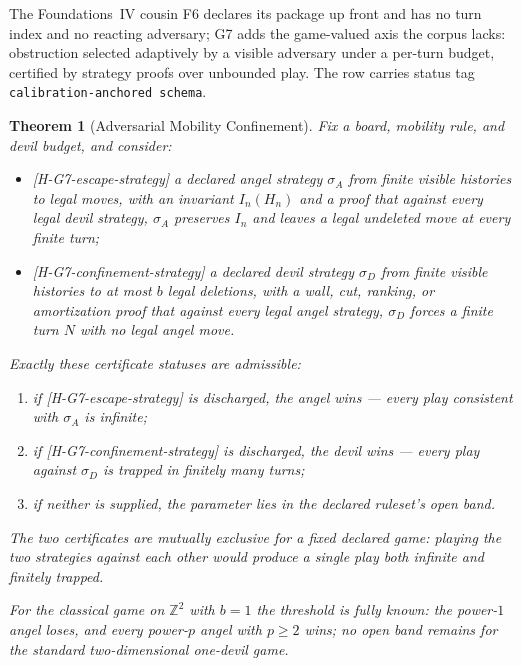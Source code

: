 \documentclass[11pt]{article}
\newcommand{\lawGSeven}{Adversarial Mobility Confinement}
\newtheorem{theorem}{Theorem}[section]
\theoremstyle{definition}
\begin{document}
The Foundations~IV cousin F6 declares its package up front and has no turn index and no reacting
adversary; G7 adds the game-valued axis the corpus lacks: obstruction selected adaptively by a
visible adversary under a per-turn budget, certified by strategy proofs over unbounded play. The row
carries status tag \texttt{calibration-anchored schema}.

\begin{theorem}[\lawGSeven]\label{thm:G7}
Fix a board, mobility rule, and devil budget, and consider:
\begin{itemize}
  \item \textup{[H-G7-escape-strategy]} a declared angel strategy $\sigma_A$ from finite visible
    histories to legal moves, with an invariant $I_n(H_n)$ and a proof that against every legal devil
    strategy, $\sigma_A$ preserves $I_n$ and leaves a legal undeleted move at every finite turn;
  \item \textup{[H-G7-confinement-strategy]} a declared devil strategy $\sigma_D$ from finite visible
    histories to at most $b$ legal deletions, with a wall, cut, ranking, or amortization proof that
    against every legal angel strategy, $\sigma_D$ forces a finite turn $N$ with no legal angel move.
\end{itemize}
Exactly these certificate statuses are admissible:
\begin{enumerate}
  \item if \textup{[H-G7-escape-strategy]} is discharged, the angel wins --- every play consistent
    with $\sigma_A$ is infinite;
  \item if \textup{[H-G7-confinement-strategy]} is discharged, the devil wins --- every play against
    $\sigma_D$ is trapped in finitely many turns;
  \item if neither is supplied, the parameter lies in the declared ruleset's open band.
\end{enumerate}
The two certificates are mutually exclusive for a fixed declared game: playing the two strategies
against each other would produce a single play both infinite and finitely trapped.

For the classical game on $\mathbb{Z}^2$ with $b = 1$ the threshold is fully known: the power-$1$
angel loses, and every power-$p$ angel with $p \ge 2$ wins; no open band remains for the standard
two-dimensional one-devil game.
\end{theorem}
\end{document}

